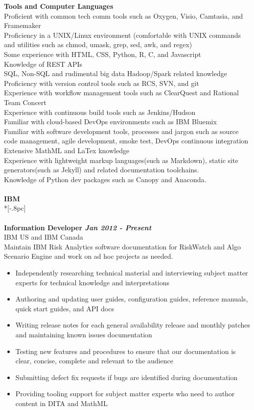 \documentclass[11pt]{extarticle}
\begin{document}
{\bf Tools and Computer Languages} \\
Proficient with common tech comm tools such as Oxygen, Visio, Camtasia, and Framemaker\\
Proficiency in a UNIX/Linux environment (comfortable with UNIX commands and utilities such as chmod, umask, grep, sed, awk, and regex)\\
Some experience with HTML, CSS, Python, R, C, and Javascript \\
Knowledge of REST APIs\\
SQL, Non-SQL and rudimental big data Hadoop/Spark related knowledge\\
Proficiency with version control tools such as RCS, SVN, and git\\
Experience with workflow management tools such as ClearQuest and Rational Team Concert \\
Experience with continuous build tools such as Jenkins/Hudson \\
Familiar with cloud-based DevOps environments such as IBM Bluemix  \\
Familiar with software development tools, processes and jargon such as source code management, agile development, smoke test, DevOps continuous integration \\
Extensive MathML and LaTex knowledge\\
Experience with lightweight markup languages(such as Markdown), static site generators(such as Jekyll) and related documentation toolchains.\\
Knowledge of Python dev packages such as Canopy and Anaconda.\\
\\
{\large \bf IBM }  \\*[-.8pc]
\underline{\hspace{6.55in}} \\
\\
{\bf Information Developer \hfill \it Jan 2012 - Present}  \\
IBM US and IBM Canada \\
Maintain IBM Risk Analytics software documentation for RiskWatch and Algo Scenario Engine and work on ad hoc projects as needed. 
\begin{itemize} 
\setlength{\itemsep}{0pt}
\item Independently researching technical material and interviewing subject matter experts for technical knowledge and interpretations
  \item Authoring and updating user guides,  configuration guides, reference manuals, quick start guides, and API docs
  \item Writing release notes for each general availability release and monthly patches and maintaining known issues documentation 
  \item Testing new features and procedures to ensure that our documentation is clear, concise, complete and relevant to the audience
	\item Submitting defect fix requests if bugs are identified during documentation 
	\item Providing tooling support for subject matter experts who need to author content in DITA and MathML \\
\end{itemize}
\end{document}
